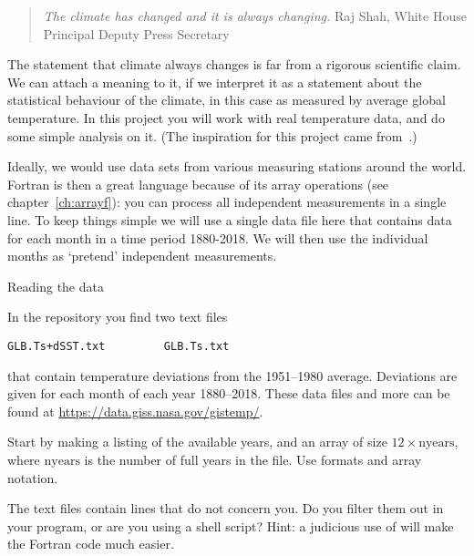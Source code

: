 
\begin{quotation}
  \noindent
  \textsl{The climate has changed and it is always changing.}
  \hfill\break\hbox{}\hfill Raj Shah, White House Principal Deputy Press Secretary\par
\end{quotation}

The statement that climate always changes is far from a rigorous
scientific claim.  We can attach a meaning to it, if we interpret it
as a statement about the statistical behaviour of the climate, in this
case as measured by average global temperature.  In this project you
will work with real temperature data, and do some simple analysis on
it. (The inspiration for this project came
from~\cite{ManRestrepo:climatechange}.)

Ideally, we would use data sets from various measuring stations around
the world. Fortran is then a great language because of its array
operations (see chapter~\ref{ch:arrayf}): you can process all
independent measurements in a single line. To keep things simple we
will use a single data file here that contains data for each month in
a time period 1880-2018. We will then use the individual months as
`pretend' independent measurements.

 {Reading the data}

In the repository you find two text files
\begin{verbatim}
GLB.Ts+dSST.txt         GLB.Ts.txt
\end{verbatim}
that contain temperature deviations from the 1951--1980 average.
Deviations are given for each month of each year 1880--2018. These
data files and more can be found at
\url{https://data.giss.nasa.gov/gistemp/}.

\begin{exercise}
  Start by making a listing of the available years, and an array
   of size $12\times\mathrm{nyears}$, where
  $\mathrm{nyears}$ is the number of full years in the file.
  Use formats and array notation.

  The text files contain lines that do not concern you. Do you filter
  them out in your program, or are you using a shell script? Hint: a
  judicious use of  will make the Fortran code much easier.

\end{exercise}

